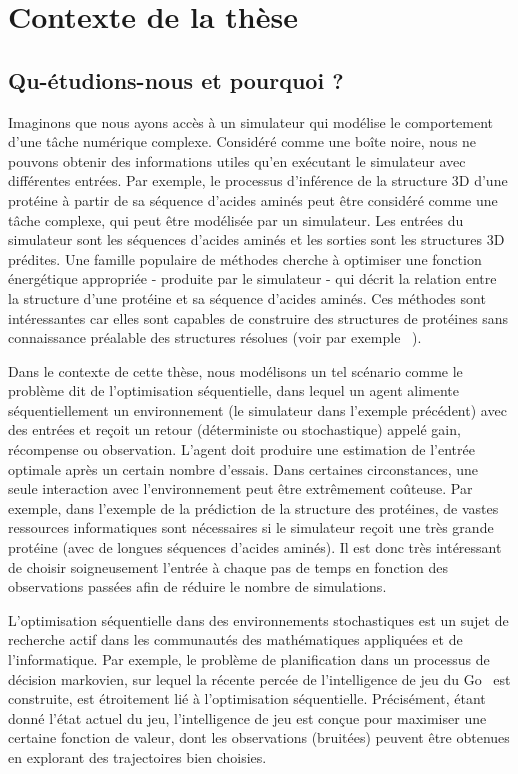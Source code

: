 \section{Contexte de la th\`ese}\label{sec:abs.context}
	
\subsection{Qu-\'etudions-nous et pourquoi ?}\label{sec:abs.context.what}

Imaginons que nous ayons accès à un simulateur qui modélise le comportement d'une tâche numérique complexe. Considéré comme une boîte noire, nous ne pouvons obtenir des informations utiles qu'en exécutant le simulateur avec différentes entrées. Par exemple, le processus d'inférence de la structure 3D d'une protéine à partir de sa séquence d'acides aminés peut être considéré comme une tâche complexe, qui peut être modélisée par un simulateur. Les entrées du simulateur sont les séquences d'acides aminés et les sorties sont les structures 3D prédites. Une famille populaire de méthodes cherche à optimiser une fonction énergétique appropriée - produite par le simulateur - qui décrit la relation entre la structure d'une protéine et sa séquence d'acides aminés. Ces méthodes sont intéressantes car elles sont capables de construire des structures de protéines sans connaissance préalable des structures résolues (voir par exemple ~\citealt{zhang2008}).

Dans le contexte de cette thèse, nous modélisons un tel scénario comme le problème dit de l'optimisation séquentielle, dans lequel un agent alimente séquentiellement un environnement (le simulateur dans l'exemple précédent) avec des entrées et reçoit un retour (déterministe ou stochastique) appelé gain, récompense ou observation. L'agent doit produire une estimation de l'entrée optimale après un certain nombre d'essais. Dans certaines circonstances, une seule interaction avec l'environnement peut être extrêmement coûteuse. Par exemple, dans l'exemple de la prédiction de la structure des protéines, de vastes ressources informatiques sont nécessaires si le simulateur reçoit une très grande protéine (avec de longues séquences d'acides aminés). Il est donc très intéressant de choisir soigneusement l'entrée à chaque pas de temps en fonction des observations passées afin de réduire le nombre de simulations.

L'optimisation séquentielle dans des environnements stochastiques est un sujet de recherche actif dans les communautés des mathématiques appliquées et de l'informatique. Par exemple, le problème de planification dans un processus de d\'ecision markovien, sur lequel la récente percée de l'intelligence de jeu du Go~\citep{silver2016alphago} est construite, est étroitement lié à l'optimisation séquentielle. Précisément, étant donné l'état actuel du jeu, l'intelligence de jeu est conçue pour maximiser une certaine fonction de valeur, dont les observations (bruitées) peuvent être obtenues en explorant des trajectoires bien choisies.

